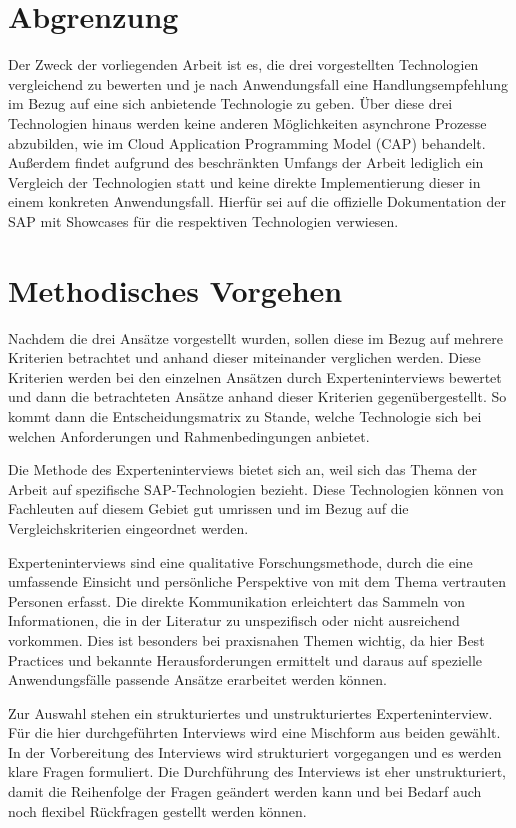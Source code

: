 \section{Abgrenzung}

Der Zweck der vorliegenden Arbeit ist es, die drei vorgestellten Technologien vergleichend zu bewerten und je nach Anwendungsfall eine Handlungsempfehlung im Bezug auf eine sich anbietende Technologie zu geben. Über diese drei Technologien hinaus werden keine anderen Möglichkeiten asynchrone Prozesse abzubilden, wie \zB im Cloud Application Programming Model (CAP) behandelt. Au{\ss}erdem findet aufgrund des beschränkten Umfangs der Arbeit lediglich ein Vergleich der Technologien statt und keine direkte Implementierung dieser in einem konkreten Anwendungsfall. Hierfür sei auf die offizielle Dokumentation der SAP mit Showcases für die respektiven Technologien verwiesen.

\section{Methodisches Vorgehen}

Nachdem die drei Ansätze vorgestellt wurden, sollen diese im Bezug auf mehrere Kriterien betrachtet und anhand dieser miteinander verglichen werden. Diese Kriterien werden bei den einzelnen Ansätzen durch Experteninterviews bewertet und dann die betrachteten Ansätze anhand dieser Kriterien gegenübergestellt. So kommt dann die Entscheidungsmatrix zu Stande, welche Technologie sich bei welchen Anforderungen und Rahmenbedingungen anbietet.

Die Methode des Experteninterviews bietet sich an, weil sich das Thema der Arbeit auf spezifische SAP-Technologien bezieht. Diese Technologien können von Fachleuten auf diesem Gebiet gut umrissen und im Bezug auf die Vergleichskriterien eingeordnet werden.

Experteninterviews sind eine qualitative Forschungsmethode, durch die eine umfassende Einsicht und persönliche Perspektive von mit dem Thema vertrauten Personen erfasst. Die direkte Kommunikation erleichtert das Sammeln von Informationen, die in der Literatur zu unspezifisch oder nicht ausreichend vorkommen. Dies ist besonders bei praxisnahen Themen wichtig, da hier Best Practices und bekannte Herausforderungen ermittelt und daraus auf spezielle Anwendungsfälle passende Ansätze erarbeitet werden können.

Zur Auswahl stehen ein strukturiertes und unstrukturiertes Experteninterview. Für die hier durchgeführten Interviews wird eine Mischform aus beiden gewählt. In der Vorbereitung des Interviews wird strukturiert vorgegangen und es werden klare Fragen formuliert. Die Durchführung des Interviews ist eher unstrukturiert, damit die Reihenfolge der Fragen geändert werden kann und bei Bedarf auch noch flexibel Rückfragen gestellt werden können.